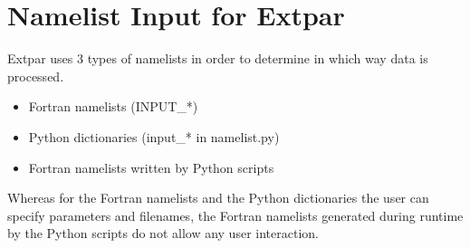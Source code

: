 \documentclass[a4paper,10pt,DIV14,BCOR1cm,titlepage,twoside]{scrartcl}
\begin{document}
\clearpage

\section{Namelist Input for Extpar} \label{namelist_input_for_extpar}
Extpar uses 3 types of namelists in order to determine in which way data is processed.

\begin{itemize}
  \item Fortran namelists (INPUT\_*)
  \item Python dictionaries (input\_* in namelist.py)
  \item Fortran namelists written by Python scripts 
\end{itemize}
Whereas for the Fortran namelists and the Python dictionaries the user can specify parameters and filenames, the Fortran namelists generated during runtime by the
Python scripts do not allow any user interaction.
\end{document}
